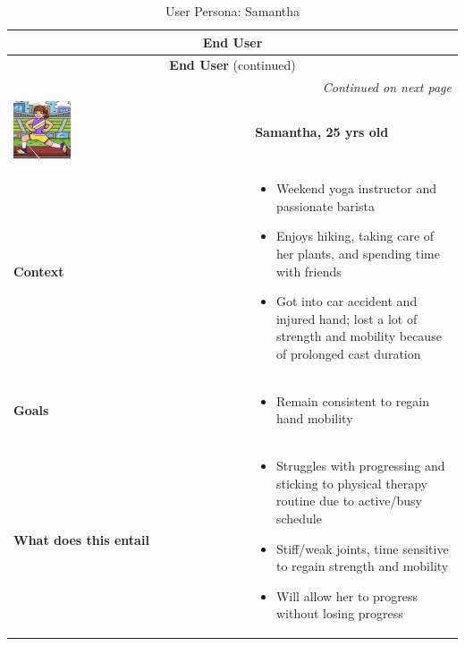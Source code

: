 \documentclass{article}
\begin{document}
\begin{longtable}{|p{}|p{}|}
    \caption{User Persona: Samantha} \label{table:user_persona_samantha} \\
    \hline
    \multicolumn{2}{|c|}{\textbf{End User}} \\ 
    \hline
    \endfirsthead

    \hline
    \multicolumn{2}{|c|}{\textbf{End User} (continued)} \\ 
    \hline
    \endhead

    \hline
    \multicolumn{2}{|r|}{\textit{Continued on next page}} \\ 
    \hline
    \endfoot

    \hline
    \endlastfoot

    \includegraphics[width=0.25\textwidth]{girl.jpeg} & \textbf{Samantha, 25 yrs old} \\ 
    \hline
    \textbf{Context} &
    \begin{itemize}[leftmargin=*]
        \item Weekend yoga instructor and passionate barista
        \item Enjoys hiking, taking care of her plants, and spending time with friends
        \item Got into car accident and injured hand; lost a lot of strength and mobility because of prolonged cast duration
    \end{itemize} \\
    \hline
    \textbf{Goals} &
    \begin{itemize}[leftmargin=*]
        \item Remain consistent to regain hand mobility
    \end{itemize} \\
    \hline
    \textbf{What does this entail} &
    \begin{itemize}[leftmargin=*]
        \item Struggles with progressing and sticking to physical therapy routine due to active/busy schedule
        \item Stiff/weak joints, time sensitive to regain strength and mobility
        \item Will allow her to progress without losing progress
    \end{itemize} \\
    \hline
\end{longtable}
\end{document}
